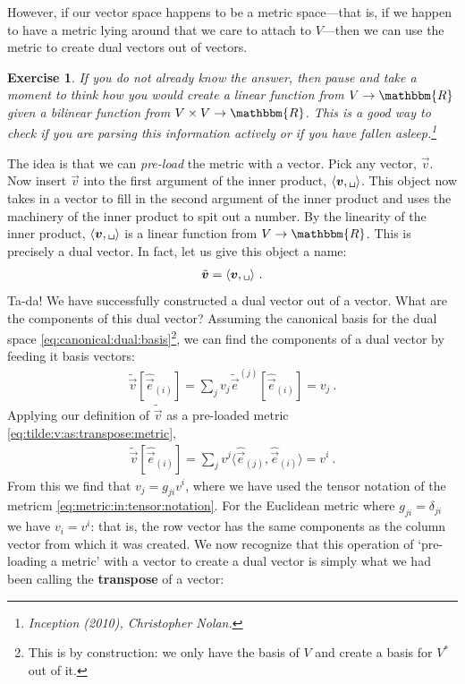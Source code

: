 \documentclass[
  11pt,
	colorful,
	raggedright,
]{tufte-style-thesis-flip}
\newtheorem{exercise}{Exercise}[section]
\begin{document}
However, if our vector space happens to be a metric space---that is, if we happen to have a metric lying around that we care to attach to $V$---then we can use the metric to create dual vectors out of vectors. 
\begin{exercise}
If you do not already know the answer, then pause and take a moment to think how you would create a linear function from $V\to \mathbbm{R}$ given a bilinear function from $V\times V\to \mathbbm{R}$. This is a good way to check if you are parsing this information actively or if you have fallen asleep.\footnote{\emph{Inception} (2010), Christopher Nolan.} 
\end{exercise}

The idea is that we can \emph{pre-load} the metric with a vector. Pick any vector, $\vec{v}$. Now insert $\vec v$ into the first argument of the inner product, $\langle \vec v , \texttt{\textvisiblespace}\rangle$. This object now takes in a vector to fill in the second argument of the inner product and uses the machinery of the inner product to spit out a number. By the linearity of the inner product, $\langle \vec v , \texttt{\textvisiblespace}\rangle$ is a linear function from $V\to \mathbbm{R}$. This is precisely a dual vector. In fact, let us give this object a name:
\begin{align}
  \tilde{\vec v} = \langle \vec v , \texttt{\textvisiblespace}\rangle \ .
  \label{eq:tilde:v:as:transpose:metric}
\end{align}
Ta-da! We have successfully constructed a dual vector out of a vector. What are the components of this dual vector? Assuming the canonical basis for the dual space \eqref{eq:canonical:dual:basis}\footnote{This is by construction: we only have the basis of $V$ and create a basis for $V^*$ out of it.}, we can find the components of a dual vector by feeding it basis vectors:
\begin{align}
  \tilde{\vec v}\left[\hat{\vec e}_{(i)}\right]
  = 
  \sum_j v_j \tilde{\vec e}^{(j)} \left[\hat{\vec e}_{(i)}\right]
  = 
  v_j \ .
\end{align}
Applying our definition of $\tilde{\vec v}$ as a pre-loaded metric \eqref{eq:tilde:v:as:transpose:metric},
\begin{align}
\tilde{\vec v}\left[\hat{\vec e}_{(i)}\right]
= 
\sum_j v^j \langle\hat{\vec e}_{(j)},\hat{\vec e}_{(i)}\rangle  
= v^i \ .
\end{align}
From this we find that $v_j = g_{ji} v^i$, where we have used the tensor notation of the metricm \eqref{eq:metric:in:tensor:notation}. For the Euclidean metric where $g_{ji} = \delta_{ji}$ we have $v_i = v^i$: that is, the row vector has the same components as the column vector from which it was created. We now recognize that this operation of `pre-loading a metric' with a vector to create a dual vector is simply what we had been calling the \textbf{transpose} of a vector:
\end{document}
